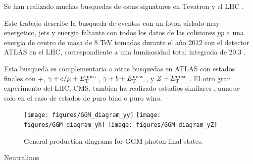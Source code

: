 

Se han realizado muchas busquedas de estas signatures en Tevatron \cite{Abazov:2007ag,Buescher:2005he}
y el LHC \cite{Aad:2012zza,Aad:2012jva,Aad:2011kz,Aad2012519,leptonphoton7,Chatrchyan:2011wc,Chatrchyan:2011ah,tagkey2015503}.

Este trabajo describe la busqueda de eventos con un foton aislado muy energetico, jets y energia faltante
con todos los datos de las colisiones $pp$ a una energia de centro de masa de 8 TeV tomadas durante
el a\~no 2012 con el detector ATLAS en el LHC, correspondiente a una luminosidad total integrada de 20.3 \ifb.

Esta busqueda es complementaria a otras busquedas en ATLAS con estados finales con
\gam\gam+\etmiss \cite{Aad2012519,ATLAS-CONF-2014-001}, $\gamma+e/\mu+E_{\mathrm{T}}^{\mathrm{miss}}$ \cite{ATLAS-CONF-2012-144},
$\gamma+b+E_{\mathrm{T}}^{\mathrm{miss}}$ \cite{Aad:2012jva}, y $Z+E_{\mathrm{T}}^{\mathrm{miss}}$ \cite{ATLAS-CONF-2012-152}. El otro gran experimento del
LHC, CMS, tambien ha realizado estudios similares \cite{CMS-PAS-SUS-12-018,CMS-PAS-SUS-14-004}, aunque solo
en el caso de estados de puro bino o puro wino.

\begin{figure}[h!]
  \centering
  \texttt{[image: figures/GGM\_diagram\_yy]}
  \texttt{[image: figures/GGM\_diagram\_yh]}
  \texttt{[image: figures/GGM\_diagram\_yZ]}
  \caption{General production diagrams for GGM photon final states.}
  \label{fig:GGM_diagrams}
\end{figure}







Neutralinos
